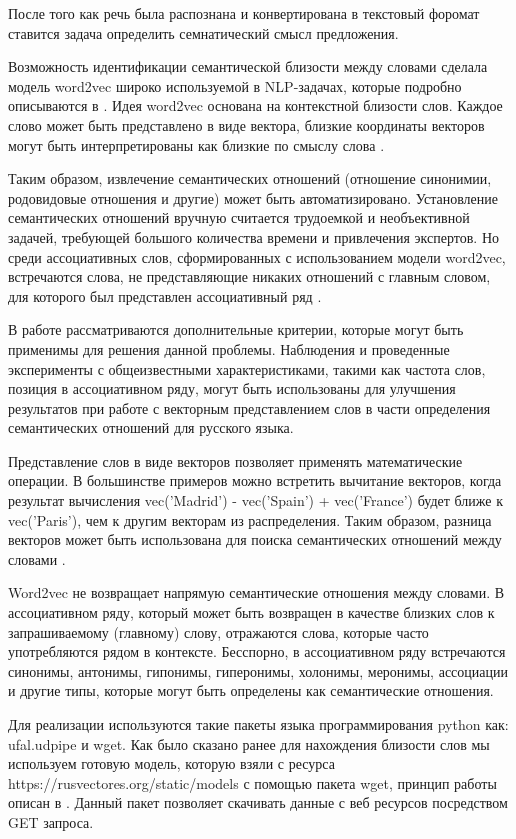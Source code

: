 После того как речь была распознана и конвертирована в текстовый форомат ставится задача определить
семнатический смысл предложения.  

Возможность идентификации семантической близости между словами сделала модель word2vec широко используемой в NLP-задачах, которые подробно описываются в \cite{neural05}. 
Идея word2vec основана на контекстной близости слов. Каждое слово может быть представлено в виде вектора, 
близкие координаты векторов могут быть интерпретированы как близкие по смыслу слова \cite{seman04}. 

Таким образом, извлечение семантических отношений (отношение синонимии, родовидовые отношения и другие) может быть автоматизировано. 
Установление семантических отношений вручную считается трудоемкой и необъективной задачей, требующей большого количества времени и 
привлечения экспертов. Но среди ассоциативных слов, сформированных с использованием модели word2vec, встречаются слова, не 
представляющие никаких отношений с главным словом, для которого был представлен ассоциативный ряд \cite{seman03}.

В работе рассматриваются дополнительные критерии, которые могут быть применимы для решения данной проблемы. Наблюдения и проведенные 
эксперименты с общеизвестными характеристиками, такими как частота слов, позиция в ассоциативном ряду, могут быть использованы для 
улучшения результатов при работе с векторным представлением слов в части определения семантических отношений для русского языка. 

Представление слов в виде векторов позволяет применять математические операции. В большинстве примеров можно встретить вычитание векторов, 
когда результат вычисления vec('Madrid') - vec('Spain') + vec('France') будет ближе к vec('Paris'), чем к другим векторам из распределения. 
Таким образом, разница векторов может быть использована для поиска семантических отношений между словами \cite{seman02}.

Word2vec не возвращает напрямую семантические отношения между словами. В ассоциативном ряду, который может быть возвращен 
в качестве близких слов к запрашиваемому (главному) слову, отражаются слова, которые часто употребляются рядом в контексте. 
Бесспорно, в ассоциативном ряду встречаются синонимы, антонимы, гипонимы, гиперонимы, холонимы, меронимы, ассоциации и другие 
типы, которые могут быть определены как семантические отношения.


Для реализации используются такие пакеты языка программирования python как: ufal.udpipe и wget. 
Как было сказано ранее для нахождения близости слов мы используем готовую модель, которую взяли с ресурса 
https://rusvectores.org/static/models с помощью пакета wget, принцип работы описан в \cite{neural08}. Данный пакет позволяет скачивать данные 
с веб ресурсов посредством GET запроса.

